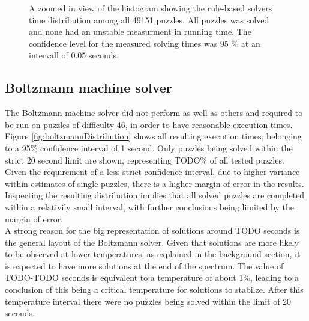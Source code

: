 \documentclass[a4paper,11pt]{kth-mag}
\begin{document}
\begin{figure}[here] 
\noindent{}
\caption{A zoomed in view of the histogram showing the rule-based solvers time distribution among all 49151 puzzles. All puzzles was solved and none had an unstable measurment in running time. The confidence level for the measured solving times was 95 \% at an intervall of 0.05 seconds.}
\label{fig:rule-basedDistribution}
\end{figure}

\FloatBarrier
\subsection{Boltzmann machine solver}
The Boltzmann machine solver did not perform as well as others and required to be run on puzzles of difficulty 46, in order to have reasonable execution times.
Figure \ref{fig:boltzmannDistribution} shows all resulting execution times, belonging to a 95\% confidence interval of 1 second.
Only puzzles being solved within the strict 20 second limit are shown, representing TODO\% of all tested puzzles.
Given the requirement of a less strict confidence interval, due to higher variance within estimates of single puzzles, there is a higher margin of error in the results.
Inspecting the resulting distribution implies that all solved puzzles are completed within a relativily small interval, with further conclusions being limited by the margin of error. \\

A strong reason for the big representation of solutions around TODO seconds is the general layout of the Boltzmann solver.
Given that solutions are more likely to be observed at lower temperatures, as explained in the background section, it is expected to have more solutions at the end of the spectrum.
The value of TODO-TODO seconds is equivalent to a temperature of about 1\%, leading to a conclusion of this being a critical temperature for solutions to stabilze.
After this temperature interval there were no puzzles being solved within the limit of 20 seconds.
\end{document}
